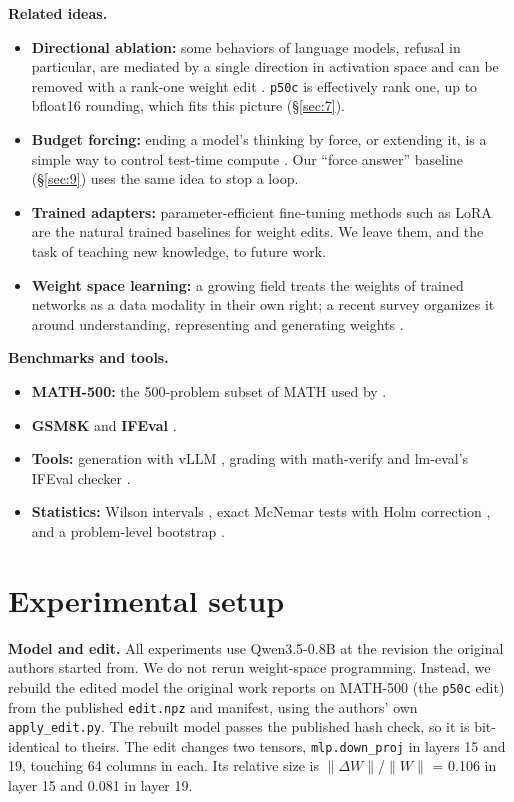 \documentclass[11pt]{article}
\begin{document}
\textbf{Related ideas.}

\begin{itemize}[nosep,leftmargin=*]
\item \textbf{Directional ablation:} some behaviors of language models, refusal in particular, are mediated by a single direction in activation space and can be removed with a rank-one weight edit \citep{arditi2024}. \texttt{p50c} is effectively rank one, up to bfloat16 rounding, which fits this picture (\S\ref{sec:7}).
\item \textbf{Budget forcing:} ending a model's thinking by force, or extending it, is a simple way to control test-time compute \citep{muennighoff2025}. Our ``force answer'' baseline (\S\ref{sec:9}) uses the same idea to stop a loop.
\item \textbf{Trained adapters:} parameter-efficient fine-tuning methods such as LoRA \citep{hu2022} are the natural trained baselines for weight edits. We leave them, and the task of teaching new knowledge, to future work.
\item \textbf{Weight space learning:} a growing field treats the weights of trained networks as a data modality in their own right; a recent survey organizes it around understanding, representing and generating weights \citep{han2026}.
\end{itemize}

\textbf{Benchmarks and tools.}

\begin{itemize}[nosep,leftmargin=*]
\item \textbf{MATH-500:} the 500-problem subset of MATH \citep{hendrycks2021} used by \citet{lightman2023}.
\item \textbf{GSM8K} \citep{cobbe2021} and \textbf{IFEval} \citep{zhou2023}.
\item \textbf{Tools:} generation with vLLM \citep{kwon2023}, grading with math-verify \citep{mathverify} and lm-eval's IFEval checker \citep{lmeval}.
\item \textbf{Statistics:} Wilson intervals \citep{wilson1927}, exact McNemar tests \citep{mcnemar1947} with Holm correction \citep{holm1979}, and a problem-level bootstrap \citep{efron1979}.
\end{itemize}

\section{Experimental setup}\label{sec:3}

\textbf{Model and edit.} All experiments use Qwen3.5-0.8B at the revision the original authors started from. We do not rerun weight-space programming. Instead, we rebuild the edited model the original work reports on MATH-500 (the \texttt{p50c} edit) from the published \texttt{edit.npz} and manifest, using the authors' own \texttt{apply\_\allowbreak{}edit.py}. The rebuilt model passes the published hash check, so it is bit-identical to theirs. The edit changes two tensors, \texttt{mlp.down\_\allowbreak{}proj} in layers 15 and 19, touching 64 columns in each. Its relative size is $\|\Delta W\|$/$\|W\|$ = 0.106 in layer 15 and 0.081 in layer 19.
\end{document}

